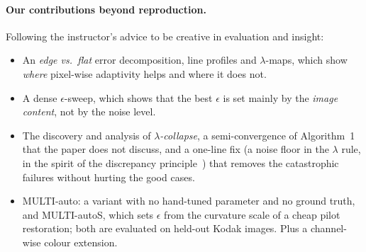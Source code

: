 \paragraph{Our contributions beyond reproduction.}
Following the instructor's advice to be creative in evaluation and insight:
\begin{itemize}[leftmargin=*,itemsep=1pt]
\item An \emph{edge vs.\ flat} error decomposition, line profiles and $\lambda$-maps,
  which show \emph{where} pixel-wise adaptivity helps and where it does not.
\item A dense $\epsilon$-sweep, which shows that the best $\epsilon$ is set mainly by
  the \emph{image content}, not by the noise level.
\item The discovery and analysis of \emph{$\lambda$-collapse}, a semi-convergence of
  Algorithm~1 that the paper does not discuss, and a one-line fix (a noise floor
  in the $\lambda$ rule, in the spirit of the discrepancy principle~\cite{morozov})
  that removes the catastrophic failures without hurting the good cases.
\item MULTI-auto: a variant with no hand-tuned parameter and no ground truth, and
  MULTI-autoS, which sets $\epsilon$ from the curvature scale of a cheap pilot restoration;
  both are evaluated on held-out Kodak images. Plus a channel-wise colour extension.
\end{itemize}

